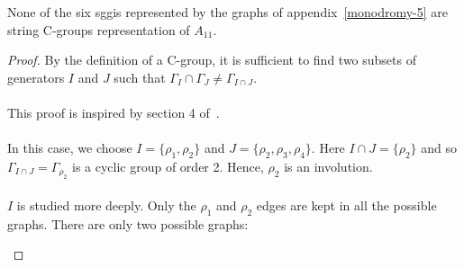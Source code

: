 \begin{lemma}
  \label{exclude-2}
  None of the six sggis represented by the graphs of appendix~\ref{monodromy-5} are string C-groups representation of $A_{11}$.
\end{lemma}

\begin{proof}
  By the definition of a C-group, it is sufficient to find two subsets of generators $I$ and $J$ such that $\Gamma_{I} \cap \Gamma_{J} \neq \Gamma_{I \cap J}$.

  \paragraph{}
  This proof is inspired by section 4 of~\cite{leemansTransactions}.

  \paragraph{}
  In this case, we choose $I = \{\rho_1, \rho_2\}$ and $J = \{\rho_2, \rho_3, \rho_4\}$. Here $I \cap J = \{\rho_2\}$ and so $\Gamma_{I \cap J} = \Gamma_{\rho_2}$ is a cyclic group of order 2. Hence, $\rho_2$ is an involution.

  \paragraph{}
  $I$ is studied more deeply. Only the $\rho_1$ and $\rho_2$ edges are kept in all the possible graphs. There are only two possible graphs:

  \begin{figure}[H]
    \begin{center}
\end{center}
\end{figure}
\end{proof}
